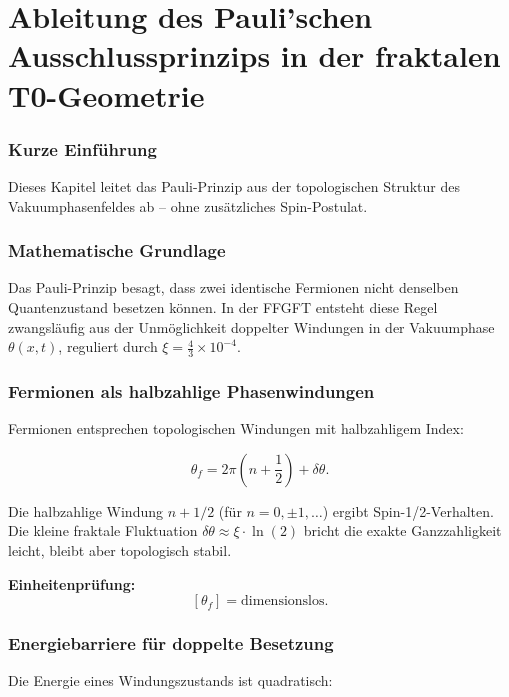\chapter{Ableitung des Pauli'schen Ausschlussprinzips in der fraktalen T0-Geometrie}


	
	\subsection*{Kurze Einführung}
	
	Dieses Kapitel leitet das Pauli-Prinzip aus der topologischen Struktur des Vakuumphasenfeldes ab – ohne zusätzliches Spin-Postulat.
	
	\subsection*{Mathematische Grundlage}
	
	Das Pauli-Prinzip besagt, dass zwei identische Fermionen nicht denselben Quantenzustand besetzen können. In der FFGFT entsteht diese Regel zwangsläufig aus der Unmöglichkeit doppelter Windungen in der Vakuumphase \(\theta(x,t)\), reguliert durch \(\xi = \frac{4}{3} \times 10^{-4}\).
	
	\subsection*{Fermionen als halbzahlige Phasenwindungen}
	
	Fermionen entsprechen topologischen Windungen mit halbzahligem Index:
	
	\begin{equation}
		\theta_f = 2\pi \left(n + \frac{1}{2}\right) + \delta \theta.
	\end{equation}
	
	Die halbzahlige Windung \(n + 1/2\) (für \(n = 0, \pm 1, \ldots\)) ergibt Spin-1/2-Verhalten. Die kleine fraktale Fluktuation \(\delta \theta \approx \xi \cdot \ln(2)\) bricht die exakte Ganzzahligkeit leicht, bleibt aber topologisch stabil.
	
	\textbf{Einheitenprüfung:}
	\[
	[\theta_f] = \text{dimensionslos}.
	\]
	
	\subsection*{Energiebarriere für doppelte Besetzung}
	
	Die Energie eines Windungszustands ist quadratisch:
	
